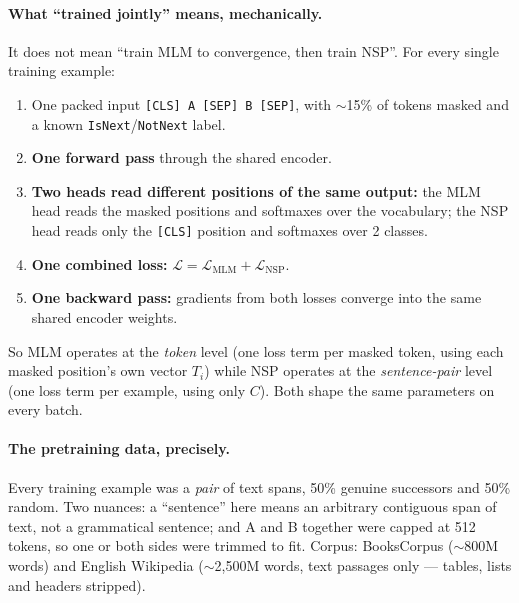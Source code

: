 \documentclass[11pt,a4paper]{article}
\begin{document}
\paragraph{What ``trained jointly'' means, mechanically.} It does not mean ``train MLM to
convergence, then train NSP''. For every single training example:
\begin{enumerate}
\item One packed input \texttt{[CLS] A [SEP] B [SEP]}, with $\sim$15\% of tokens masked and a
  known \texttt{IsNext}/\texttt{NotNext} label.
\item \textbf{One forward pass} through the shared encoder.
\item \textbf{Two heads read different positions of the same output:} the MLM head reads the
  masked positions and softmaxes over the vocabulary; the NSP head reads only the
  \texttt{[CLS]} position and softmaxes over 2 classes.
\item \textbf{One combined loss:} $\mathcal{L} = \mathcal{L}_{\text{MLM}} +
  \mathcal{L}_{\text{NSP}}$.
\item \textbf{One backward pass:} gradients from both losses converge into the same shared
  encoder weights.
\end{enumerate}
So MLM operates at the \emph{token} level (one loss term per masked token, using each masked
position's own vector $T_i$) while NSP operates at the \emph{sentence-pair} level (one loss
term per example, using only $C$). Both shape the same parameters on every batch.

\paragraph{The pretraining data, precisely.} Every training example was a \emph{pair} of text
spans, 50\% genuine successors and 50\% random. Two nuances: a ``sentence'' here means an
arbitrary contiguous span of text, not a grammatical sentence; and A and B together were
capped at 512 tokens, so one or both sides were trimmed to fit. Corpus: BooksCorpus
($\sim$800M words) and English Wikipedia ($\sim$2{,}500M words, text passages only --- tables,
lists and headers stripped).
\end{document}
